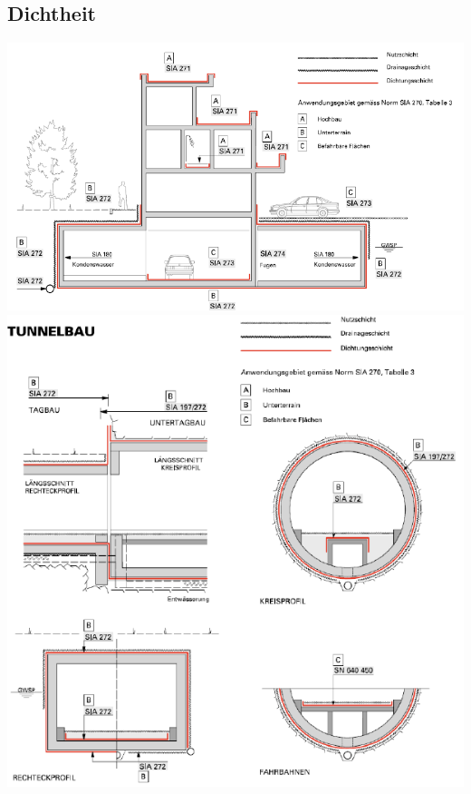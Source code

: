 
	\begin{multicols}{2}
		
		\section{Dichtheit}
		

			
			\includegraphics[width=\linewidth]{images/Dichtheit1HochbauAbdichtung.PNG}
			\includegraphics[width=\linewidth]{images/Dichtheit2TunnelAbdichtung.PNG}



\end{multicols}
